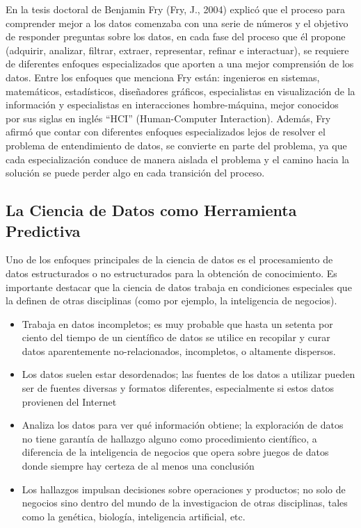 \documentclass[letterpaper, spanish, 11pt]{report}
\begin{document}
En la tesis doctoral de Benjamin Fry (Fry, J., 2004) explicó que el proceso para comprender mejor a los datos comenzaba con una serie de números y el objetivo de responder preguntas sobre los datos, en cada fase del proceso que él propone (adquirir, analizar, filtrar, extraer, representar, refinar e interactuar), se requiere de diferentes enfoques especializados que aporten a una mejor comprensión de los datos. Entre los enfoques que menciona Fry están: ingenieros en sistemas, matemáticos, estadísticos, diseñadores gráficos, especialistas en visualización de la información y especialistas en interacciones hombre-máquina, mejor conocidos por sus siglas en inglés “HCI” (Human-Computer Interaction). Además, Fry afirmó que contar con diferentes enfoques especializados lejos de resolver el problema de entendimiento de datos, se convierte en parte del problema, ya que cada especialización conduce de manera aislada el problema y el camino hacia la solución se puede perder algo en cada transición del proceso.

\subsection{La Ciencia de Datos como Herramienta Predictiva}
Uno de los enfoques principales de la ciencia de datos es el procesamiento de datos estructurados o no estructurados para la obtención de conocimiento. Es importante destacar que la ciencia de datos trabaja en condiciones especiales que la definen de otras disciplinas (como por ejemplo, la inteligencia de negocios).

\begin{itemize}
	\item Trabaja en datos incompletos; es muy probable que hasta un setenta por ciento del tiempo de un científico de datos se utilice en recopilar y curar datos aparentemente no-relacionados, incompletos, o altamente dispersos.
	\item Los datos suelen estar desordenados; las fuentes de los datos a utilizar pueden ser de fuentes diversas y formatos diferentes, especialmente si estos datos provienen del Internet
	\item Analiza los datos para ver qué información obtiene; la exploración de datos no tiene garantía de hallazgo alguno como procedimiento científico, a diferencia de la inteligencia de negocios que opera sobre juegos de datos donde siempre hay certeza de al menos una conclusión
	\item Los hallazgos impulsan decisiones sobre operaciones y productos; no solo de negocios sino dentro del mundo de la investigacion de otras disciplinas, tales como la genética, biología, inteligencia artificial, etc.
\end{itemize}
\end{document}
